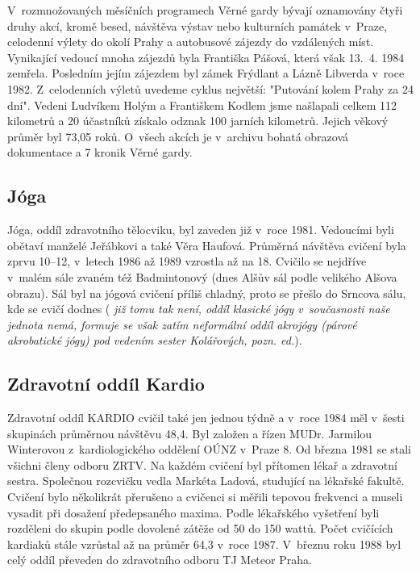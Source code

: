 \documentclass[a5paper, 11pt, twoside]{article}
\newcommand{\pozned}[1]{%
\textit{#1}}
\begin{document}
V~rozmnožovaných měsíčních programech Věrné gardy bývají oznamovány
čtyři druhy akcí, kromě besed, návštěva výstav nebo kulturních památek
v~Praze, celodenní výlety do okolí Prahy a autobusové zájezdy do
vzdálených míst. Vynikající vedoucí mnoha zájezdů byla Františka Pášová,
která však 13.~4. 1984 zemřela. Posledním jejím zájezdem byl zámek
Frýdlant a Lázně Libverda v~roce 1982. Z~celodenních výletů uvedeme
cyklus největší: "Putování kolem Prahy za 24 dní". Vedeni Ludvíkem
Holým a Františkem Kodlem jsme našlapali celkem 112 kilometrů a 20
účastníků získalo odznak 100 jarních kilometrů. Jejich věkový průměr byl
73,05 roků. O~všech akcích je v~archivu bohatá obrazová dokumentace a 7
kronik Věrné gardy.

\subsection{Jóga}

Jóga, oddíl zdravotního tělocviku, byl zaveden již v~roce 1981.
Vedoucími byli obětaví manželé Jeřábkovi a také Věra Haufová. Průměrná
návštěva cvičení byla zprvu 10--12, v~letech 1986 až 1989 vzrostla až na
18. Cvičilo se nejdříve v~malém sále zvaném též Badmintonový (dnes Alšův
sál podle velikého Alšova obrazu). Sál byl na jógová cvičení příliš
chladný, proto se přešlo do Srncova sálu, kde se cvičí dodnes (\pozned{již
tomu tak není, oddíl klasické jógy v~současnosti naše jednota nemá,
formuje se však zatím neformální oddíl akrojógy (párové akrobatické
jógy) pod vedením sester Kolářových, pozn. ed.}).

\subsection{Zdravotní oddíl Kardio}

Zdravotní oddíl KARDIO cvičil také jen jednou týdně a v~roce 1984 měl
v~šesti skupinách průměrnou návštěvu 48,4. Byl založen a řízen MUDr.
Jarmilou Winterovou z~kardiologického oddělení OÚNZ v~Praze 8. Od března
1981 se stali všichni členy odboru ZRTV. Na každém cvičení byl přítomen
lékař a zdravotní sestra. Společnou rozcvičku vedla Markéta Ladová,
studující na lékařské fakultě. Cvičení bylo několikrát přerušeno a
cvičenci si měřili tepovou frekvenci a museli vysadit při dosažení
předepsaného maxima. Podle lékařského vyšetření byli rozděleni do skupin
podle dovolené zátěže od 50 do 150 wattů. Počet cvičících kardiaků stále
vzrůstal až na průměr 64,3 v~roce 1987. V~březnu roku 1988 byl celý
oddíl převeden do zdravotního odboru TJ Meteor Praha.
\end{document}
